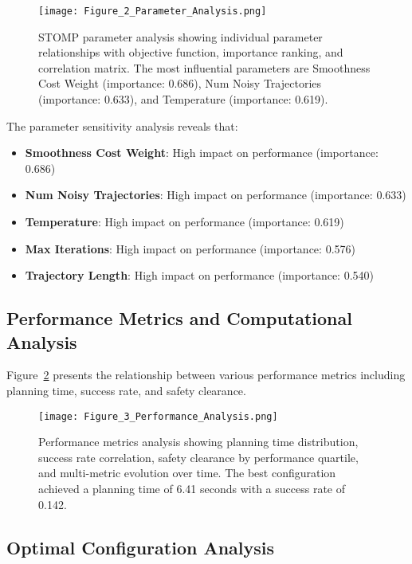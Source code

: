 \documentclass[12pt]{article}
\begin{document}
\begin{figure}[H]
\centering
\texttt{[image: Figure\_2\_Parameter\_Analysis.png]}
\caption{STOMP parameter analysis showing individual parameter relationships with objective function, importance ranking, and correlation matrix. The most influential parameters are Smoothness Cost Weight (importance: 0.686), Num Noisy Trajectories (importance: 0.633), and Temperature (importance: 0.619).}
\label{fig:parameter_analysis}
\end{figure}

The parameter sensitivity analysis reveals that:
\begin{itemize}
    \item \textbf{Smoothness Cost Weight}: High impact on performance (importance: 0.686)
    \item \textbf{Num Noisy Trajectories}: High impact on performance (importance: 0.633)
    \item \textbf{Temperature}: High impact on performance (importance: 0.619)
    \item \textbf{Max Iterations}: High impact on performance (importance: 0.576)
    \item \textbf{Trajectory Length}: High impact on performance (importance: 0.540)
\end{itemize}

\subsection{Performance Metrics and Computational Analysis}

Figure~\ref{fig:performance_analysis} presents the relationship between various performance metrics including planning time, success rate, and safety clearance.

\begin{figure}[H]
\centering
\texttt{[image: Figure\_3\_Performance\_Analysis.png]}
\caption{Performance metrics analysis showing planning time distribution, success rate correlation, safety clearance by performance quartile, and multi-metric evolution over time. The best configuration achieved a planning time of 6.41 seconds with a success rate of 0.142.}
\label{fig:performance_analysis}
\end{figure}

\subsection{Optimal Configuration Analysis}
\end{document}
